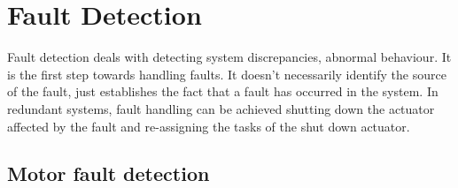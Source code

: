 \section{Fault Detection}

Fault detection deals with detecting system discrepancies, abnormal behaviour. It is the first step towards handling faults. It doesn't necessarily identify the source of the fault, just establishes the fact that a fault has occurred in the system. In redundant systems, fault handling can be achieved shutting down the actuator affected by the fault and re-assigning the tasks of the shut down actuator.


\subsection{Motor fault detection}















